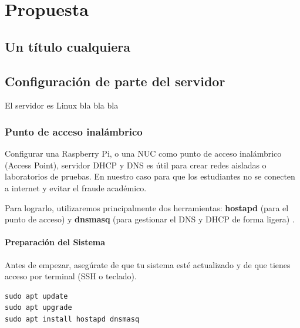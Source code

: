 
\chapter{Propuesta}
\label{ch:propuesta}

\lipsum[1]

\section{Un título cualquiera}

\lipsum[1]

\section{Configuración de parte del servidor}

El servidor es Linux bla bla bla

\subsection{Punto de acceso inalámbrico}

Configurar una Raspberry Pi, o una NUC como punto de acceso inalámbrico
(Access Point), servidor DHCP y DNS es útil para crear redes aisladas o
laboratorios de pruebas. En nuestro caso para que los estudiantes no se
conecten a internet y evitar el fraude académico.

Para lograrlo, utilizaremos principalmente dos herramientas:
\textbf{hostapd} (para el punto de acceso) \cite{raspberrypi_hotspot_2026}
\cite{malinen_hostapd_2025} y \textbf{dnsmasq} (para gestionar el
DNS y DHCP de forma ligera) \cite{kelley_dnsmasq_2024}.

\subsubsection{Preparación del Sistema}

Antes de empezar, asegúrate de que tu sistema esté actualizado
y de que tienes acceso por terminal (SSH o teclado).

\begin{lstlisting}
sudo apt update
sudo apt upgrade
sudo apt install hostapd dnsmasq
\end{lstlisting}

